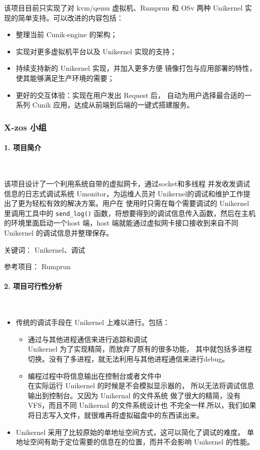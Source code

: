 \documentclass[UTF8,fontset=none,linespread=1.15]{ctexart}
\begin{document}
该项目目前只实现了对 kvm/qemu 虚拟机、Rumprun 和 OSv 两种 Unikernel 实现的简单支持。可以改进的内容包括：
\begin{itemize}
\item 整理当前 Cunik-engine 的架构；
\item 实现对更多虚拟机平台以及 Unikernel 实现的支持；
\item 持续支持新的 Unikernel 实现，并加入更多方便
镜像打包与应用部署的特性，使其能够满足生产环境的需要；
\item 更好的交互体验：实现在用户发出 Request 后，
自动为用户选择最合适的一系列 Cunik 应用，达成从前端到后端的一键式搭建服务。
\end{itemize}

\subsubsection{ X-zos 小组}\label{ssubsec:x-zos}

\paragraph{1. 项目简介}~\par

该项目设计了一个利用系统自带的虚拟网卡，通过socket和多线程
并发收发调试信息的日志式调试系统 Umonitor，为运维人员对
Unikernel的调试和维护工作提出了更为轻松有效的解决方案。用户在
使用时只需在每个需要调试的 Unikernel 里调用工具中的 \texttt{send\_log()}
函数，将想要得到的调试信息传入函数，然后在主机的环境里面启动一个host 端，host 端就能通过虚拟网卡接口接收到来自不同 Unikernel 的调试信息并整理保存。

关键词： Unikernel、调试

参考项目： Rumprun

\paragraph{2. 项目可行性分析}~\par
\begin{itemize}
\item 传统的调试手段在 Unikernel 上难以进行。包括：
    \begin{itemize}
    \item 通过与其他进程通信来进行追踪和调试\\
        Unikernel 为了实现精简，而放弃了原有的很多功能，
        其中就包括多进程切换。没有了多进程，就无法利用与其他进程通信来进行debug。
    \item 编程过程中将信息输出在控制台或者文件中\\
        在实际运行 Unikernel 的时候是不会模拟显示器的，
        所以无法将调试信息输出到控制台。又因为 Unikernal 的文件系统
        做了很大的精简，没有VFS，而且不同 Unikernal 的文件系统设计也
        不完全一样,所以，我们如果将日志写入文件，就很难再将虚拟磁盘中的东西读出来。
    \end{itemize}
\item Unikernel 采用了比较原始的单地址空间方式，这可以简化了调试的难度。
单地址空间有助于定位需要的信息在的位置，而并不会影响 Unikernel 的性能。
\end{itemize}
\end{document}
